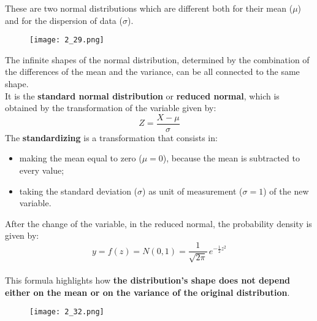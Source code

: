 \begin{frame}
  \vspace*{.25cm}
  These are two normal distributions which are different both for their mean ($ \mu $) and for the dispersion of data ($ \sigma $).
  \begin{figure}
    \texttt{[image: 2\_29.png]}
  \end{figure}
\end{frame}


\begin{frame}
  The infinite shapes of the normal distribution, determined by the combination of the differences of the mean and the variance, can be all connected to the same shape.\\
  \vspace*{.25cm}
  It is the \textbf{standard normal distribution} or \textbf{reduced normal}, which is obtained by the transformation of the variable given by:
  \vspace*{.25cm}
  $$ Z = \frac{X-\mu} {\sigma} $$
  \vspace*{.25cm}
  The \textbf{standardizing} is a transformation that consists in:
  \begin{itemize}
    \item making the mean equal to zero ($ \mu = 0 $), because the mean is subtracted to every value;
    \item taking the standard deviation ($ \sigma $) as unit of measurement ($ \sigma = 1 $) of the new variable.
  \end{itemize}
\end{frame}

\begin{frame}
  \vspace*{.5cm}
  After the change of the variable, in the reduced normal, the probability density is given by:\\
  \vspace*{.25cm}
  $$y = f(z) = N(0,1) = \frac{1}{\sqrt{2\pi}}\,e^{-\frac{1}{2}z^2} $$\\
  \vspace*{1cm}
  This formula highlights how \textbf{the distribution's shape does not depend either on the mean or on the variance of the original distribution}.
\end{frame}

\begin{frame}
  \begin{figure}
    \texttt{[image: 2\_32.png]}
  \end{figure}
\end{frame}

